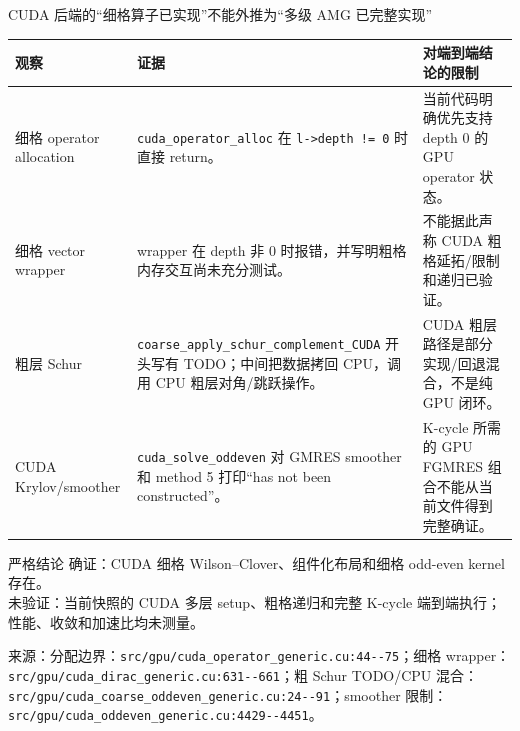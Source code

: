 \documentclass[UTF8,aspectratio=169,11pt]{ctexbeamer}
\newcommand{\source}[1]{%
  \vspace{0.06em}\par{\raggedright\scriptsize\color{muted}来源：#1\par}}
\newcommand{\verified}{\textcolor{evidence}{确证}}
\newcommand{\unverified}{\textcolor{warning}{未验证}}
\newcommand{\code}[1]{\nolinkurl{#1}}
\newcommand{\denseframe}{%
  \footnotesize
  \setlength{\tabcolsep}{2.5pt}%
  \renewcommand{\arraystretch}{0.76}%
}
\begin{document}
\begin{frame}[t]{CUDA 后端的“细格算子已实现”不能外推为“多级 AMG 已完整实现”}
  \denseframe
  \scriptsize
  \begin{tabularx}{0.96\textwidth}{@{}p{}p{}Y@{}}
    \toprule
    观察 & 证据 & 对端到端结论的限制 \\
    \midrule
    细格 operator allocation & \code{cuda_operator_alloc} 在 \code{l->depth != 0} 时直接 return。 & 当前代码明确优先支持 depth 0 的 GPU operator 状态。 \\
    细格 vector wrapper & wrapper 在 depth 非 0 时报错，并写明粗格内存交互尚未充分测试。 & 不能据此声称 CUDA 粗格延拓/限制和递归已验证。 \\
    粗层 Schur & \code{coarse_apply_schur_complement_CUDA} 开头写有 TODO；中间把数据拷回 CPU，调用 CPU 粗层对角/跳跃操作。 & CUDA 粗层路径是部分实现/回退混合，不是纯 GPU 闭环。 \\
    CUDA Krylov/smoother & \code{cuda_solve_oddeven} 对 GMRES smoother 和 method 5 打印“has not been constructed”。 & K-cycle 所需的 GPU FGMRES 组合不能从当前文件得到完整确证。 \\
    \bottomrule
  \end{tabularx}
  \vspace{0cm}
  \begin{block}{严格结论}
    \verified：CUDA 细格 Wilson--Clover、组件化布局和细格 odd-even kernel 存在。\\
    \unverified：当前快照的 CUDA 多层 setup、粗格递归和完整 K-cycle 端到端执行；性能、收敛和加速比均未测量。
  \end{block}
  \source{分配边界：\code{src/gpu/cuda_operator_generic.cu:44--75}；细格 wrapper：\code{src/gpu/cuda_dirac_generic.cu:631--661}；粗 Schur TODO/CPU 混合：\code{src/gpu/cuda_coarse_oddeven_generic.cu:24--91}；smoother 限制：\code{src/gpu/cuda_oddeven_generic.cu:4429--4451}。}
\end{frame}
\end{document}

